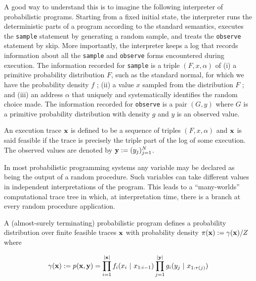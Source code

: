 A good way to understand this is to imagine the following interpreter of probabilistic programs. Starting from a fixed initial state, the interpreter runs the deterministic parts of a program according to the standard semantics, executes the \texttt{sample} statement by generating a random sample, and treats the \texttt{observe} statement by skip. More importantly, the interpreter keeps a log that records information about all the \texttt{sample} and \texttt{observe} forms encountered during execution. The information recorded for \texttt{sample} is a triple $(F, x, \alpha)$ of (i) a primitive probability distribution $F$, such as the standard normal, for which we have the probability density $f$ ; (ii) a value $x$ sampled from the distribution $F$ ; and (iii) an address $\alpha$ that uniquely and systematically identifies the random choice made. The information recorded for \texttt{observe} is a pair $(G,y)$ where $G$ is a primitive probability distribution with density $g$ and $y$ is an observed value.

An execution trace $\boldsymbol{\mathbf{x}}$ is defined to be a sequence of triples $(F, x, \alpha)$ and $\boldsymbol{\mathbf{x}}$ is said feasible if the trace is precisely the triple part of the log of some execution.
The observed values are denoted by $\boldsymbol{\mathbf{y}} := (y_j)_{j=1}^N$.

In most probabilistic programming systems any variable may be declared as being the output of a random procedure. Such variables can take different values in independent interpretations of the program. This leads to a ``many-worlds'' computational trace tree in which, at interpretation time, there is a branch at every random procedure application.


A (almost-surely terminating) probabilistic program defines a probability distribution over finite feasible traces $\boldsymbol{\mathbf{x}}$ with probability density $\pi(\boldsymbol{\mathbf{x}}) := \gamma(\boldsymbol{\mathbf{x}}) / Z$ where 

\begin{equation*}
\gamma(\boldsymbol{\mathbf{x}}) := p(\boldsymbol{\mathbf{x}}, \boldsymbol{\mathbf{y}}) = \prod_{i=1}^{|\boldsymbol{\mathbf{x}}|}{f_{i}(x_i~|~x_{1:i-1})} \prod_{j=1}^{|\boldsymbol{\mathbf{y}}|}{g_i(y_j~|~x_{1:\tau(j)})}
\end{equation*}

